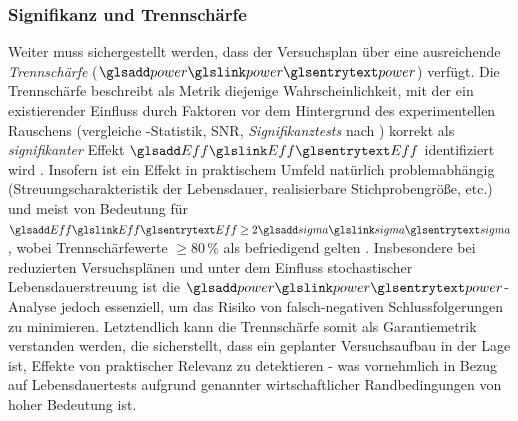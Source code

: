 \subsubsection{Signifikanz und Trennschärfe}
Weiter muss sichergestellt werden, dass der Versuchsplan über eine ausreichende \textit{Trennschärfe} ($\sym{power}$) verfügt.
Die Trennschärfe beschreibt als Metrik diejenige Wahrscheinlichkeit, mit der ein existierender Einfluss durch Faktoren vor dem Hintergrund des experimentellen Rauschens (vergleiche \textbf{}-Statistik, \ac{SNR}, \textit{Signifikanztests} nach \cite{Kleppmann.2020,Montgomery.2020,Goos.2011}) korrekt als \textit{signifikanter} Effekt $\sym{Eff}$ identifiziert wird \cite{Siebertz.2026,Kleppmann.2020}.
Insofern ist ein Effekt in praktischem Umfeld natürlich problemabhängig (Streuungscharakteristik der Lebensdauer, realisierbare Stichprobengröße, etc.) und meist von Bedeutung für $\sym{Eff} \geq 2\sym{sigma}$, wobei Trennschärfewerte $\geq 80\,\%$ als befriedigend gelten \cite{Rigdon.2022,Montgomery.2020}.
Insbesondere bei reduzierten Versuchsplänen und unter dem Einfluss stochastischer Lebensdauerstreuung ist die $\sym{power}$-Analyse jedoch essenziell, um das Risiko von falsch-negativen Schlussfolgerungen zu minimieren.
Letztendlich kann die Trennschärfe somit als Garantiemetrik verstanden werden, die sicherstellt, dass ein geplanter Versuchsaufbau in der Lage ist, Effekte von praktischer Relevanz zu detektieren \cite{Cohen.1988,Myers.2016} - was vornehmlich in Bezug auf Lebensdauertests aufgrund genannter wirtschaftlicher Randbedingungen von hoher Bedeutung ist.

